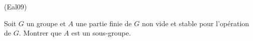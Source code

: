 \begin{tiny}(Eal09)\end{tiny} Soit $G$ un groupe et $A$ une partie finie de $G$ non vide et stable pour l'opération de $G$. Montrer que $A$ est un sous-groupe.